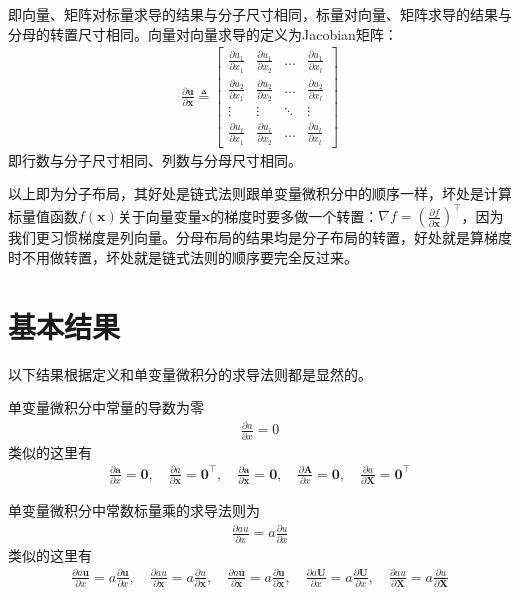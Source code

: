 \documentclass{ctexart}
\newcommand{\blue}[1]{\textcolor{Solarized-blue}{#1}}
\theoremstyle{definition}
\def \zerov {\bm{0}}
\def \av {\bm{a}}
\def \uv {\bm{u}}
\def \xv {\bm{x}}
\def \Av {\mathbf{A}}
\def \Uv {\mathbf{U}}
\def \Xv {\mathbf{X}}
\begin{document}
即向量、矩阵对标量求导的结果\blue{与分子尺寸相同}，标量对向量、矩阵求导的结果\blue{与分母的转置尺寸相同}。向量对向量求导的定义为Jacobian矩阵：
\begin{align*}
    \frac{\partial \uv}{\partial \xv} \triangleq \begin{bmatrix}
        \frac{\partial u_1}{\partial x_1} & \frac{\partial u_1}{\partial x_2} & \ldots & \frac{\partial u_1}{\partial x_l} \\
        \frac{\partial u_2}{\partial x_1} & \frac{\partial u_2}{\partial x_2} & \ldots & \frac{\partial u_2}{\partial x_l} \\
        \vdots                            & \vdots                            & \ddots & \vdots                            \\
        \frac{\partial u_l}{\partial x_1} & \frac{\partial u_l}{\partial x_2} & \ldots & \frac{\partial u_l}{\partial x_l}
    \end{bmatrix}
\end{align*}
即\blue{行数与分子尺寸相同}、\blue{列数与分母尺寸相同}。

以上即为\blue{分子布局}，其好处是\blue{链式法则跟单变量微积分中的顺序一样}，坏处是计算标量值函数$f(\xv)$关于向量变量$\xv$的梯度时要\blue{多做一个转置}：$\nabla f = (\frac{\partial f}{\partial \xv})^\top$，因为我们更习惯梯度是列向量。分母布局的结果均是分子布局的转置，好处就是算梯度时不用做转置，坏处就是链式法则的顺序要完全反过来。

\section{基本结果}

以下结果根据定义和单变量微积分的求导法则都是显然的。

单变量微积分中\blue{常量的导数为零}
\begin{align*}
    \frac{\partial a}{\partial x} = 0
\end{align*}
类似的这里有
\begin{align*}
    \frac{\partial \av}{\partial x} = \zerov, \quad \frac{\partial a}{\partial \xv} = \zerov^\top, \quad \frac{\partial \av}{\partial \xv} = \zerov, \quad \frac{\partial \Av}{\partial x} = \zerov, \quad \frac{\partial a}{\partial \Xv} = \zerov^\top
\end{align*}

单变量微积分中\blue{常数标量乘}的求导法则为
\begin{align*}
    \frac{\partial a u}{\partial x} = a \frac{\partial u}{\partial x}
\end{align*}
类似的这里有
\begin{align*}
    \frac{\partial a \uv}{\partial x} = a \frac{\partial \uv}{\partial x}, \quad \frac{\partial a u}{\partial \xv} = a \frac{\partial u}{\partial \xv}, \quad \frac{\partial a \uv}{\partial \xv} = a \frac{\partial \uv}{\partial \xv}, \quad \frac{\partial a \Uv}{\partial x} = a \frac{\partial \Uv}{\partial x}, \quad \frac{\partial a u}{\partial \Xv} = a \frac{\partial u}{\partial \Xv}
\end{align*}
\end{document}
